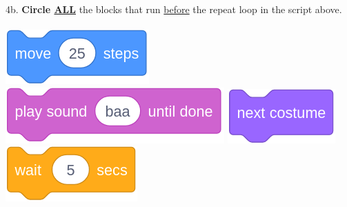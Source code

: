 \documentclass[letterpaper,12pt]{article}
\begin{document}
\noindent 4b. \textbf{Circle \underline{ALL}} the blocks that run \underline{before} the repeat loop in the script above. \\ \\
\includegraphics[scale=.3]{q4_script1.png} \hspace{1cm}
\includegraphics[scale=.3]{q4_script2.png} \hspace{1cm}
\includegraphics[scale=.3]{q4_script3.png} \hspace{1cm}
\includegraphics[scale=.3]{q4_script4.png} \hspace{1cm}\\
\end{document}
